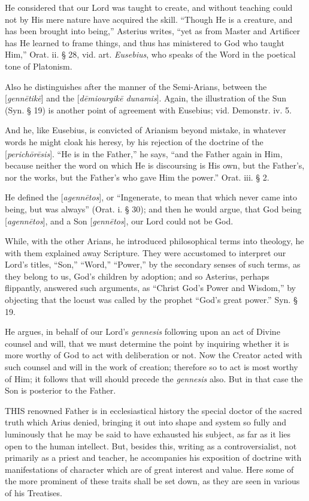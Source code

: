 He considered that our Lord was taught to create,
and without teaching could not by His mere nature have acquired the
skill. ``Though He is a creature, and has been brought into being,''
Asterius writes, ``yet as from Master and Artificer has He learned to
frame things, and thus has ministered to God who taught Him,'' Orat.
ii. § 28, vid. art. \emph{Eusebius}, who speaks of the Word in the
poetical tone of Platonism.

Also he distinguishes after the manner of the
Semi-Arians, between the [\emph{genn\={e}tik\={e}}] and the [\emph{d\={e}miourgik\={e}
dunamis}]. Again, the illustration of the Sun (Syn. § 19) is
another point of agreement with Eusebius; vid. Demonstr. iv. 5.

And he, like Eusebius, is convicted of Arianism
beyond mistake, in whatever words he might cloak his heresy, by his
rejection of the doctrine of the [\emph{perich\={o}r\={e}sis}]. ``He
is in the Father,'' he says, ``and the Father again in Him, because
neither the word on which He is discoursing is His own, but the Father's,
nor the works, but the Father's who gave Him the power.'' Orat. iii. §
2.

He defined the [\emph{agenn\={e}tos}], or ``Ingenerate,
to mean that which never came into being, but was always'' (Orat. i. §
30); and then he would argue, that God being [\emph{agenn\={e}tos}],
and a Son [\emph{genn\={e}tos}], our Lord could not be God.

While, with the other Arians, he introduced
philosophical terms into theology, he with them explained away
Scripture. They were accustomed to interpret our Lord's titles, ``Son,''
``Word,'' ``Power,'' by the secondary senses of such terms, as they belong
to us, God's children by adoption; and so Asterius, perhaps
flippantly, answered such arguments, as ``Christ God's Power and
Wisdom,'' by objecting that the locust was called by the prophet ``God's
great power.'' Syn. § 19.

He argues, in behalf of our Lord's \emph{gennesis}
following upon an act of Divine counsel and will, that we must
determine the point by inquiring whether it is more worthy of God to
act with deliberation or not. Now the Creator acted with such counsel
and will in the work of creation; therefore so to act is most worthy
of Him; it follows that will should precede the \emph{gennesis} also.
But in that case the Son is posterior to the Father.


THIS
renowned Father is in ecclesiastical history the special doctor of the
sacred truth which Arius denied, bringing it out into shape and system
so fully and luminously that he may be said to have exhausted his
subject, as far as it lies open to the human intellect. But, besides
this, writing as a controversialist, not primarily as a priest and
teacher, he accompanies his exposition of doctrine with manifestations
of character which are of great interest and value. Here some of the
more prominent of these traits shall be set down, as they are seen in
various of his Treatises.

